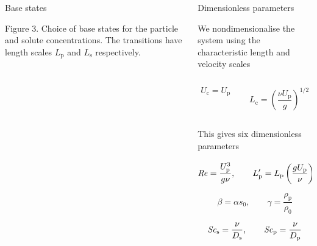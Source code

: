 \documentclass[final]{beamer} %
\newcommand\Rey{\mbox{\textit{Re}}}  %
\newcommand\Sc{\mbox{\textit{Sc}}}  %
\begin{document}
\begin{frame}[t]
\begin{columns}[t]
\begin{column}{0.3\paperwidth}
\begin{block}{Base states}
          \vspace{-1cm}

          \centering \footnotesize Figure 3. Choice of base states for the
          particle and solute concentrations. The transitions have length scales
          $L_{\text{p}}$ and $L_{\text{s}}$ respectively.
          
      \end{block}

    \end{column}

    \begin{column}{0.26\paperwidth}
      \begin{block}{Dimensionless parameters}

        \centering We nondimensionalise the system using the characteristic length and velocity scales

        \vspace{-2cm}
        
        \begin{columns}[t]
          \begin{column}{0.13\paperwidth}
            \centering

            $$ U_{\text{c}} = U_{\text{p}} $$

          \end{column}
          
          \begin{column}{0.13\paperwidth}
            \centering

            $$ L_{\text{c}} = \left(\frac{\nu U_{\text{p}}}{g}\right)^{1/2} $$

          \end{column}

        \end{columns}

        \vspace{2cm}
        
        \centering This gives six dimensionless parameters
        
            $$ \Rey = \frac{U_{\text{p}}^{3}}{g \nu}, \quad  \quad L_{\text{p}}' = L_{\text{p}} \left(\frac{g U_{\text{p}}}{\nu}\right)^{1/2} $$

            $$\beta = \alpha s_{0}, \quad  \quad \gamma = \frac{\rho_{\text{p}}}{\rho_{0}}$$

            $$\Sc_{\text{s}} = \frac{\nu}{D_{\text{s}}},  \quad  \quad \Sc_{\text{p}} = \frac{\nu}{D_{\text{p}}} $$
      \end{block}



\end{column}
\end{columns}
\end{frame}
\end{document}
